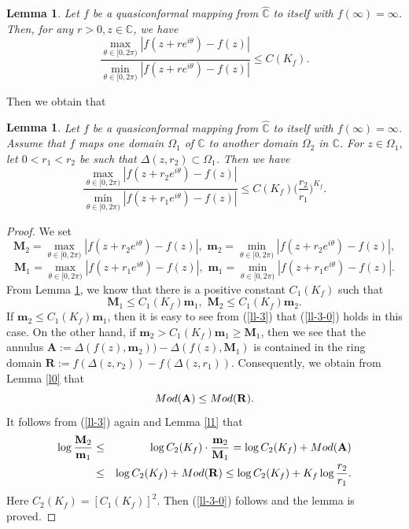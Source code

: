 \documentclass[11pt]{amsart}
\newtheorem{lemma}[theorem]{Lemma}
\theoremstyle{remark}
\theoremstyle{claim}
\theoremstyle{definition}
\theoremstyle{problem}
\theoremstyle{conjecture}
\theoremstyle{question}
\numberwithin{equation}{section}
\begin{document}
\begin{lemma}\label{l2}
Let $f$ be a quasiconformal mapping from $\widehat{\mathbb{C}}$ to itself with $f(\infty)=\infty$. Then, for any $r>0, z\in \mathbb{C}$, we have
\begin{equation}
\frac{\max\limits_{\theta\in [0, 2\pi)}|f(z+re^{i\theta})-f(z)|}{\min\limits_{\theta\in [0,2\pi)}|f(z+re^{i\theta})-f(z)|}\leq C(K_f).\nonumber
\end{equation}
\end{lemma}

Then we obtain that
\begin{lemma}\label{l3}
Let $f$ be a quasiconformal mapping from $\widehat{\mathbb{C}}$ to itself with $f(\infty)=\infty$.  Assume that $f$ maps one domain $\Omega_1$ of $\mathbb{C}$ to another domain $\Omega_2$ in $\mathbb{C}$. For $z\in \Omega_1$, let $0<r_1<r_2$ be such that $\Delta(z, r_2)\subset \Omega_1$.  Then we have
\begin{equation}\label{ll-3-0}
 \frac{\max\limits_{\theta\in [0,2\pi)}|f(z+r_2 e^{i\theta})-f(z)|}{\min\limits_{\theta\in [0,2\pi)}|f(z+r_1 e^{i\theta})-f(z)|}\leq C(K_f) \Big(\frac{r_2}{r_1}\Big)^{K_f}.
\end{equation}
\end{lemma}
\begin{proof}
We set
$$\mathbf{M}_2=\max\limits_{\theta\in [0,2\pi)}|f(z+r_2 e^{i\theta})-f(z)|, \,\, \mathbf{m}_2=\min\limits_{\theta\in [0,2\pi)}|f(z+r_2 e^{i\theta})-f(z)|,$$
$$\mathbf{M}_1=\max\limits_{\theta\in [0,2\pi)}|f(z+r_1 e^{i\theta})-f(z)|, \,\, \mathbf{m}_1=\min\limits_{\theta\in [0,2\pi)}|f(z+r_1 e^{i\theta})-f(z)|.$$
From Lemma \ref{l2}, we know that there is a positive constant $C_1(K_f)$ such that
 \begin{equation}\label{ll-3}
\mathbf{M}_1 \leq C_1(K_f) \mathbf{m}_1,\,\, \mathbf{M}_2 \leq C_1(K_f) \mathbf{m}_2.
\end{equation}
If $\mathbf{m}_2 \leq C_1(K_f)\mathbf{m}_1$, then it is easy to see from (\ref{ll-3}) that (\ref{ll-3-0}) holds in this case.
On the other hand, if $\mathbf{m}_2>C_1(K_f)\mathbf{m}_1\geq \mathbf{M}_1$, then we see that the annulus $\mathbf{A}:=\Delta(f(z), \mathbf{m}_2))-\Delta(f(z), \mathbf{M}_1)$ is contained in the ring domain $\mathbf{R}:=f(\Delta(z,r_2))-f(\Delta(z,r_1))$.  Consequently, we obtain from Lemma \ref{l0} that
$${\textup{Mod}}(\mathbf{A})\leq {\textup{Mod}}(\mathbf{R}).$$
It follows from (\ref{ll-3}) again and Lemma \ref{l1} that
\begin{eqnarray}\log\frac{\mathbf{M}_2}{\mathbf{m}_1}&\leq&  \log C_2(K_f)\cdot \frac{\mathbf{m}_2}{\mathbf{M}_1}=\log C_2(K_f)+{\textup{Mod}}(\mathbf{A})\nonumber \\
&\leq&\log C_2(K_f)+{\textup{Mod}}(\mathbf{R})\leq\log C_2(K_f)+K_f \log \frac{r_2}{r_1}.\nonumber \end{eqnarray}
Here $C_2(K_f)=[C_1(K_f)]^2$. Then (\ref{ll-3-0}) follows and the lemma is proved.
\end{proof}
\end{document}
